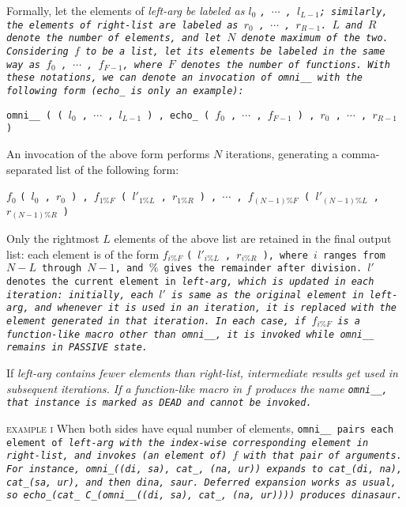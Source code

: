 Formally, let the elements of \it{left-arg} be
labeled as $l_0$ \tt{,} $\cdots$ \tt{,} $l_{L-1}$;
similarly, the elements of \it{right-list} are
labeled as $r_0$ \tt{,} $\cdots$ \tt{,} $r_{R-1}$.
$L$ and $R$ denote the number of elements,
and let $N$ denote maximum of the two.
Considering $f$ to be a list, let its elements be labeled
in the same way as $f_0$ \tt{,} $\cdots$ \tt{,} $f_{F-1}$,
where $F$ denotes the number of functions.
With these notations, we can denote an invocation of \tt{omni__}
with the following form (\tt{echo_} is only an example):

\centerline
{
\tt{omni__ ( (}  $l_0$ \tt{,} $\cdots$ \tt{,} $l_{L-1}$
\tt{) , echo_ (} $f_0$ \tt{,} $\cdots$ \tt{,} $f_{F-1}$
\tt{) ,}  $r_0$ \tt{,} $\cdots$ \tt{,} $r_{R-1}$ \tt{)}
}

An invocation of the above form performs $N$ iterations,
generating a comma-separated list of the following form:

\centerline
{
$f_0$ \tt{(} $l_0$ \tt{,} $r_0$ \tt{) ,}
$f_{1\%F}$ \tt{(} $l'_{1\%L}$ \tt{,} $r_{1\%R}$ \tt{) ,}
$\cdots$ \tt{,}
$f_{(N - 1)\%F}$ \tt{(} $l'_{(N - 1)\%L}$ \tt{,} $r_{(N - 1)\%R}$ \tt{)}
}

Only the rightmost $L$ elements of the above list are retained
in the final output list: each element is of the form
$f_{i\%F}$ \tt{(} $l'_{i\%L}$ \tt{,} $r_{i\%R}$ \tt{)}, where $i$ ranges
from $N - L$ through $N - 1$, and $\%$ gives the remainder after division.
$l'$ denotes the current element in \it{left-arg}, which is updated
in each iteration: initially, each $l'$ is same as the original
element in \it{left-arg}, and whenever it is used in an iteration,
it is replaced with the element generated in that iteration.
In each case, if $f_{i\%F}$ is a function-like macro other than \tt{omni__},
it is invoked while \tt{omni__} remains in \it{\tt{PASSIVE}} state.

\note If \it{left-arg} contains fewer elements than \it{right-list},
intermediate results get used in subsequent iterations.
If a function-like macro in $f$ produces the name \tt{omni__},
that instance is marked as \it{\tt{DEAD}} and cannot be invoked.

\textsc{example i}\indent
When both sides have equal number of elements, \tt{omni__} pairs each element
of \it{left-arg} with the index-wise corresponding element in \it{right-list},
and invokes (an element of) $f$ with that pair of arguments.
For instance, \tt{omni_((di, sa), cat_, (na, ur))} expands to
\tt{cat_(di, na), cat_(sa, ur)}, and then \tt{dina, saur}.
Deferred expansion works as usual,
so \tt{echo_(cat_ C_(omni__((di, sa), cat_, (na, ur))))} produces \tt{dinasaur}.

